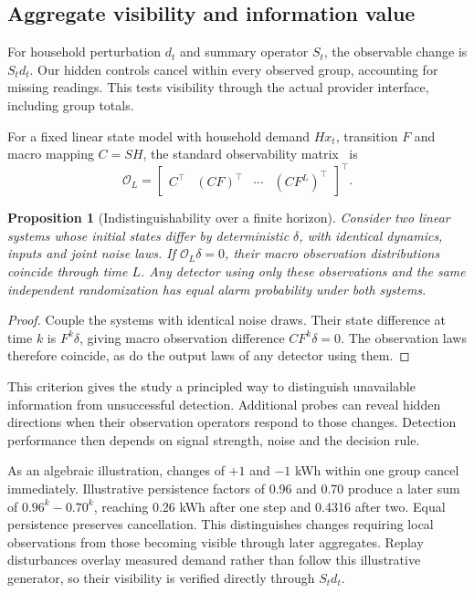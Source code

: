 \documentclass[conference]{IEEEtran}
\newtheorem{proposition}{Proposition}
\begin{document}
\subsection{Aggregate visibility and information value}
For household perturbation $d_t$ and summary operator $S_t$, the observable change is $S_t d_t$. Our hidden controls cancel within every observed group, accounting for missing readings. This tests visibility through the actual provider interface, including group totals.

For a fixed linear state model with household demand $Hx_t$, transition $F$ and macro mapping $C=SH$, the standard observability matrix~\cite{hespanha} is
\begin{equation}
\mathcal O_L=\begin{bmatrix}C^\top&(CF)^\top&\cdots&(CF^L)^\top\end{bmatrix}^{\!\top}.
\end{equation}
\begin{proposition}[Indistinguishability over a finite horizon]
Consider two linear systems whose initial states differ by deterministic $\delta$, with identical dynamics, inputs and joint noise laws. If $\mathcal O_L\delta=0$, their macro observation distributions coincide through time $L$. Any detector using only these observations and the same independent randomization has equal alarm probability under both systems.
\end{proposition}
\begin{proof}
Couple the systems with identical noise draws. Their state difference at time $k$ is $F^k\delta$, giving macro observation difference $CF^k\delta=0$. The observation laws therefore coincide, as do the output laws of any detector using them.
\end{proof}

This criterion gives the study a principled way to distinguish unavailable information from unsuccessful detection. Additional probes can reveal hidden directions when their observation operators respond to those changes. Detection performance then depends on signal strength, noise and the decision rule.

As an algebraic illustration, changes of $+1$ and $-1$ kWh within one group cancel immediately. Illustrative persistence factors of 0.96 and 0.70 produce a later sum of $0.96^k-0.70^k$, reaching 0.26 kWh after one step and 0.4316 after two. Equal persistence preserves cancellation. This distinguishes changes requiring local observations from those becoming visible through later aggregates. Replay disturbances overlay measured demand rather than follow this illustrative generator, so their visibility is verified directly through $S_t d_t$.
\end{document}
